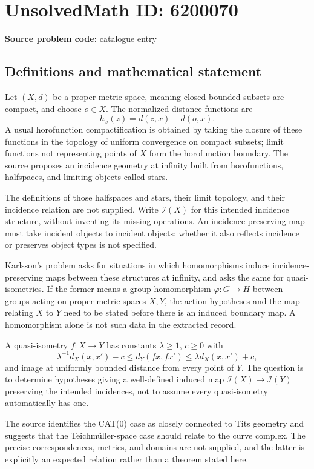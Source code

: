 \documentclass[11pt]{article}
\begin{document}
\section*{UnsolvedMath ID: 6200070}
\textbf{Source problem code:} catalogue entry
\subsection{Definitions and mathematical statement}
Let $(X,d)$ be a proper metric space, meaning closed bounded subsets are compact, and choose $o\in X$. The normalized distance functions are
\[
 h_x(z)=d(z,x)-d(o,x).
\]
A usual horofunction compactification is obtained by taking the closure of these functions in the topology of uniform convergence on compact subsets; limit functions not representing points of $X$ form the horofunction boundary. The source proposes an incidence geometry at infinity built from horofunctions, halfspaces, and limiting objects called stars.

The definitions of those halfspaces and stars, their limit topology, and their incidence relation are not supplied. Write $\mathcal I(X)$ for this intended incidence structure, without inventing its missing operations. An incidence-preserving map must take incident objects to incident objects; whether it also reflects incidence or preserves object types is not specified.

Karlsson's problem asks for situations in which homomorphisms induce incidence-preserving maps between these structures at infinity, and asks the same for quasi-isometries. If the former means a group homomorphism $\varphi:G\to H$ between groups acting on proper metric spaces $X,Y$, the action hypotheses and the map relating $X$ to $Y$ need to be stated before there is an induced boundary map. A homomorphism alone is not such data in the extracted record.

A quasi-isometry $f:X\to Y$ has constants $\lambda\ge1$, $c\ge0$ with
\[
 \lambda^{-1}d_X(x,x')-c\le d_Y(fx,fx')
       \le\lambda d_X(x,x')+c,
\]
and image at uniformly bounded distance from every point of $Y$. The question is to determine hypotheses giving a well-defined induced map $\mathcal I(X)\to\mathcal I(Y)$ preserving the intended incidences, not to assume every quasi-isometry automatically has one.

The source identifies the CAT(0) case as closely connected to Tits geometry and suggests that the Teichmüller-space case should relate to the curve complex. The precise correspondences, metrics, and domains are not supplied, and the latter is explicitly an expected relation rather than a theorem stated here.
\end{document}
